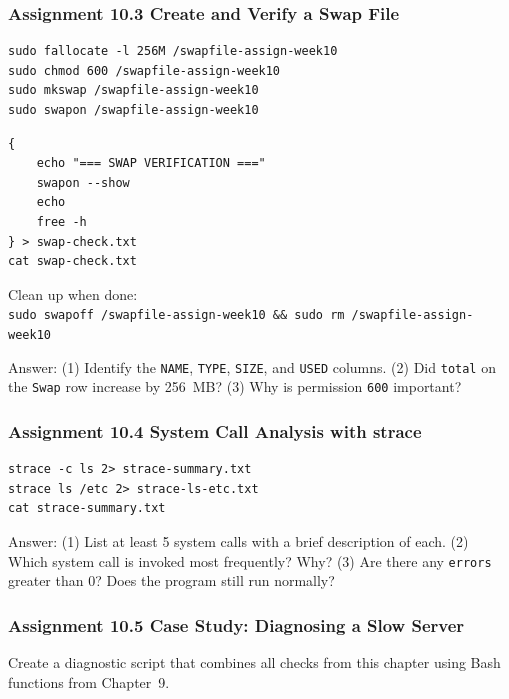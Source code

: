 \subsubsection{Assignment 10.3 Create and Verify a Swap File}

\begin{lstlisting}[caption={Create and activate the assignment swap file}]
sudo fallocate -l 256M /swapfile-assign-week10
sudo chmod 600 /swapfile-assign-week10
sudo mkswap /swapfile-assign-week10
sudo swapon /swapfile-assign-week10
\end{lstlisting}

\begin{lstlisting}[caption={Verify and save the result}]
{
    echo "=== SWAP VERIFICATION ==="
    swapon --show
    echo
    free -h
} > swap-check.txt
cat swap-check.txt
\end{lstlisting}

\begin{notebox}
Clean up when done:\\
\texttt{sudo swapoff /swapfile-assign-week10 \&\& sudo rm /swapfile-assign-week10}
\end{notebox}

Answer: (1) Identify the \texttt{NAME}, \texttt{TYPE}, \texttt{SIZE}, and
\texttt{USED} columns. (2) Did \texttt{total} on the \texttt{Swap} row increase
by 256~MB? (3) Why is permission \texttt{600} important?

\subsubsection{Assignment 10.4 System Call Analysis with strace}

\begin{lstlisting}[caption={Save summary and detailed system calls}]
strace -c ls 2> strace-summary.txt
strace ls /etc 2> strace-ls-etc.txt
cat strace-summary.txt
\end{lstlisting}

Answer: (1) List at least 5 system calls with a brief description of each.
(2) Which system call is invoked most frequently? Why? (3) Are there any
\texttt{errors} greater than 0? Does the program still run normally?

\subsubsection{Assignment 10.5 Case Study: Diagnosing a Slow Server}

Create a diagnostic script that combines all checks from this chapter using
Bash functions from Chapter~9.

